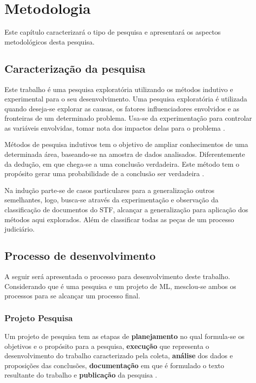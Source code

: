 \chapter[Metodologia]{Metodologia}
Este capítulo caracterizará o tipo de pesquisa e apresentará os aspectos metodológicos desta pesquisa.

\section{Caracterização da pesquisa}

Este trabalho é uma pesquisa exploratória utilizando os métodos indutivo e experimental para o seu desenvolvimento. Uma pesquisa exploratória é utilizada quando deseja-se explorar as causas, os fatores influenciadores envolvidos e as fronteiras de um determinado problema. Usa-se da experimentação para controlar as variáveis envolvidas, tomar nota dos impactos delas para o problema \cite{PRODANOV2013}.

Métodos de pesquisa indutivos tem o objetivo de ampliar conhecimentos de uma determinada área, baseando-se na amostra de dados analisados. Diferentemente da dedução, em que chega-se a uma conclusão verdadeira. Este método tem o propósito gerar uma probabilidade de a conclusão ser verdadeira \cite{PRODANOV2013}.

Na indução parte-se de casos particulares para a generalização outros semelhantes\cite{PRODANOV2013},
logo, busca-se através da experimentação e observação da classificação de documentos do STF, alcançar a generalização para aplicação dos métodos aqui explorados. Além de classificar todas as peças de um processo judiciário.

\section{Processo de desenvolvimento}

A seguir será apresentada o processo para desenvolvimento deste trabalho. Considerando que é uma pesquisa e um projeto de ML, mesclou-se ambos os processos para se alcançar um processo final.

\subsection{Projeto Pesquisa} \label{sec:projetoPesquisa}

Um projeto de pesquisa tem as etapas de \textbf{planejamento} no qual formula-se os objetivos e o propósito para a pesquisa, \textbf{execução} que representa o desenvolvimento do trabalho caracterizado pela coleta, \textbf{análise} dos dados e proposições das conclusões, \textbf{documentação} em que é formulado o texto resultante do trabalho e \textbf{publicação} da pesquisa \cite{PRODANOV2013}.

